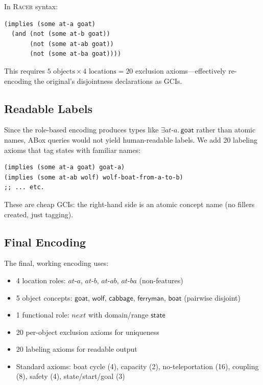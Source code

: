 \documentclass[11pt,a4paper]{article}
\newcommand{\DLsome}[2]{\exists #1.\,#2}
\newcommand{\Racer}{\textsc{Racer}}
\newcommand{\concept}[1]{\ensuremath{\mathsf{#1}}}
\newcommand{\role}[1]{\ensuremath{\mathit{#1}}}
\begin{document}
In \Racer{} syntax:
\begin{lstlisting}[style=racer]
(implies (some at-a goat)
  (and (not (some at-b goat))
       (not (some at-ab goat))
       (not (some at-ba goat))))
\end{lstlisting}

This requires $5 \text{ objects} \times 4 \text{ locations} = 20$
exclusion axioms---effectively re-encoding the original's disjointness
declarations as GCIs.

\subsection{Readable Labels}

Since the role-based encoding produces types like
$\DLsome{\role{at\text{-}a}}{\concept{goat}}$ rather than atomic names,
ABox queries would not yield human-readable labels.  We add 20 labeling
axioms that tag states with familiar names:
\begin{lstlisting}[style=racer]
(implies (some at-a goat) goat-a)
(implies (some at-ab wolf) wolf-boat-from-a-to-b)
;; ... etc.
\end{lstlisting}

These are cheap GCIs: the right-hand side is an atomic concept name (no
fillers created, just tagging).

\subsection{Final Encoding}

The final, working encoding uses:
\begin{itemize}[nosep]
  \item 4 location roles: \role{at\text{-}a}, \role{at\text{-}b}, \role{at\text{-}ab}, \role{at\text{-}ba} (non-features)
  \item 5 object concepts: \concept{goat}, \concept{wolf}, \concept{cabbage}, \concept{ferryman}, \concept{boat} (pairwise disjoint)
  \item 1 functional role: \role{next} with domain/range \concept{state}
  \item 20 per-object exclusion axioms for uniqueness
  \item 20 labeling axioms for readable output
  \item Standard axioms: boat cycle (4), capacity (2), no-teleportation (16), coupling (8), safety (4), state/start/goal (3)
\end{itemize}
\end{document}
